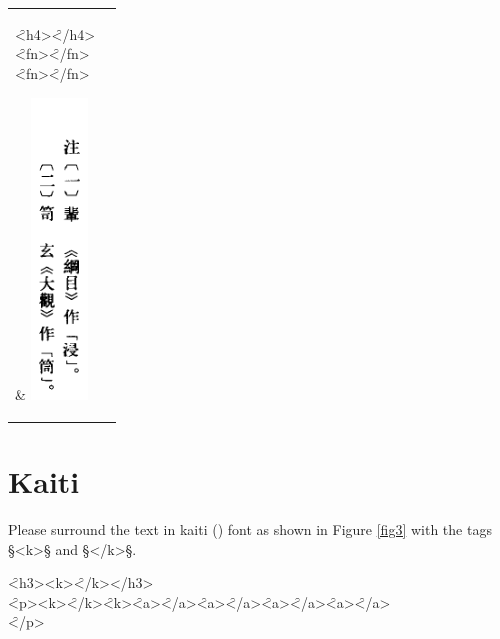 \documentclass[fontsize=11pt, paper=a4, 
  DIV15,
  normalheadings,
  parskip=half-, 
  pointlessnumbers]{scrartcl}
\begin{document}
\begin{tabular}{@{}ll}
\parbox[b]{131mm}{
  \begin{typeChinese}
    \f{<h4>}\f{</h4>}\\
    \f{<fn>}\f{</fn>}\\
    \f{<fn>}\f{</fn>}
  \end{typeChinese}
} & 
\includegraphics[height=8cm]{image2}
\end{tabular}


\section{Kaiti }
\begin{mainrule}
  Please surround the text in kaiti () font as shown in Figure \ref{fig3} with the tags §<k>§ and §</k>§.
\end{mainrule}
  \begin{typeChinese}
 \f{<h3><k>}\f{</k></h3>}\\
 \f{<p><k>}\f{</k>}\untranscribedText{}\f{<k>}\f{<a>}\f{</a>}\f{<a>}\f{</a>}\untranscribedText{}\f{<a>}\f{</a>}\untranscribedText{}\f{<a>}\f{</a>}\\
\someText \f{</p>}
  \end{typeChinese}
\end{document}
